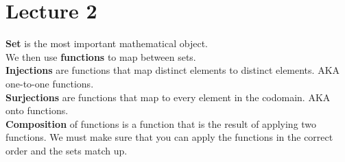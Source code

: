 \documentclass[answers,12pt,addpoints]{exam}
\begin{document}
\section*{Lecture 2}
\textbf{Set} is the most important mathematical object.\\
We then use \textbf{functions} to map between sets.\\
\textbf{Injections} are functions that map distinct elements to distinct elements. AKA one-to-one functions.\\
\textbf{Surjections} are functions that map to every element in the codomain. AKA onto functions.\\
\textbf{Composition} of functions is a function that is the result of applying two functions. We must make sure that you can apply the functions in the correct order and the sets match up.\\
\end{document}
